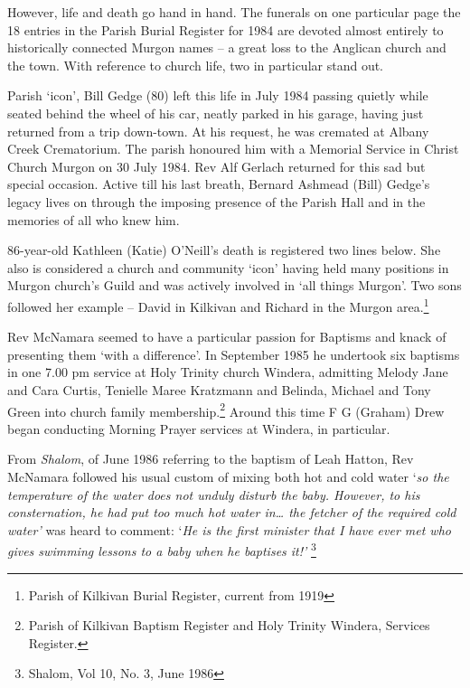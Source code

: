 However, life and death go hand in hand. The funerals on one particular page the 18 entries in the Parish Burial Register for 1984 are devoted almost entirely to historically connected Murgon names -- a great loss to the Anglican church and the town. With reference to church life, two in particular stand out.



Parish `icon', Bill Gedge (80) left this life in July 1984 passing quietly while seated behind the wheel of his car, neatly parked in his garage, having just returned from a trip down-town. At his request, he was cremated at Albany Creek Crematorium. The parish honoured him with a Memorial Service in Christ Church Murgon on 30 July 1984. Rev Alf Gerlach returned for this sad but special occasion. Active till his last breath, Bernard Ashmead (Bill) Gedge's legacy lives on through the imposing presence of the Parish Hall and in the memories of all who knew him.



86-year-old Kathleen (Katie) O'Neill's death is registered two lines below. She also is considered a church and community `icon' having held many positions in Murgon church's Guild and was actively involved in `all things Murgon'. Two sons followed her example -- David in Kilkivan and Richard in the Murgon area.\footnote{Parish of Kilkivan Burial Register, current from 1919}


Rev McNamara seemed to have a particular passion for Baptisms and knack of presenting them `with a difference'. In September 1985 he undertook six baptisms in one 7.00 pm service at Holy Trinity church Windera, admitting Melody Jane and Cara Curtis, Tenielle Maree Kratzmann and Belinda, Michael and Tony Green into church family membership.\footnote{Parish of Kilkivan Baptism Register and Holy Trinity Windera, Services Register.} Around this time F G (Graham) Drew began conducting Morning Prayer services at Windera, in particular.


From \emph{Shalom}, of June 1986 referring to the baptism of Leah Hatton, Rev McNamara followed his usual custom of mixing both hot and cold water `\emph{so the temperature of the water does not unduly disturb the baby. However, to his consternation, he had put too much hot water in\ldots{} the fetcher of the required cold water'} was heard to comment: `\emph{He is the first minister that I have ever met who gives swimming lessons to a baby when he baptises it!'} \footnote{Shalom, Vol 10, No. 3, June 1986}


